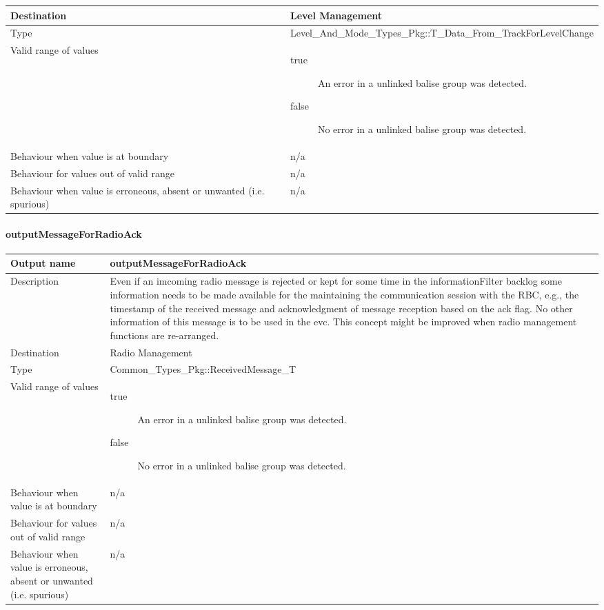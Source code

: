 \begin{longtable}{p{}p{}}
\\
\midrule
Destination				& Level Management\\ 
\midrule
Type					& Level\_And\_Mode\_Types\_Pkg::T\_Data\_From\_TrackForLevelChange\\
\midrule
Valid range of values	& \begin{description}
\item[true] An error in a unlinked balise group was detected.
\item[false] No error in a unlinked balise group was detected.
\end{description} \\
\midrule
Behaviour when value is at boundary	& n/a\\
\midrule
Behaviour for values out of valid range	& n/a\\
\midrule
Behaviour when value is erroneous, absent or unwanted (i.e. spurious) & n/a\\
\bottomrule
\end{longtable}


\paragraph{outputMessageForRadioAck}

\begin{longtable}{p{}p{}}
\toprule
Output name				& outputMessageForRadioAck \\
\midrule
Description				& Even if an imcoming radio message is rejected or kept for some time in the informationFilter backlog some information needs to be made available for the maintaining the communication session with the RBC, e.g., the timestamp of the received message and acknowledgment of message reception based on the ack flag. No other information of this message is to be used in the evc. This concept might be improved when radio management functions are re-arranged.
\\
\midrule
Destination				& Radio Management\\ 
\midrule
Type					& Common\_Types\_Pkg::ReceivedMessage\_T \\
\midrule
Valid range of values	& \begin{description}
\item[true] An error in a unlinked balise group was detected.
\item[false] No error in a unlinked balise group was detected.
\end{description} \\
\midrule
Behaviour when value is at boundary	& n/a\\
\midrule
Behaviour for values out of valid range	& n/a\\
\midrule
Behaviour when value is erroneous, absent or unwanted (i.e. spurious) & n/a\\
\bottomrule
\end{longtable}

